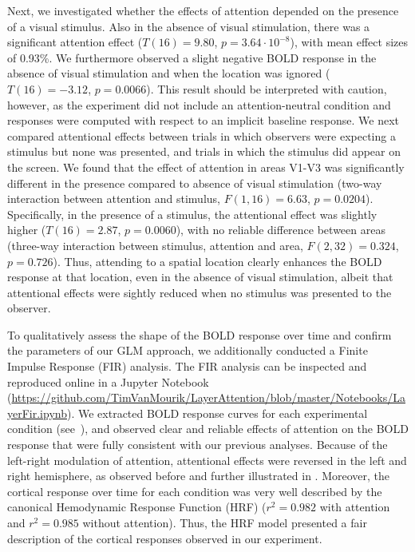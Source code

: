 \documentclass[9pt,lineno]{aperture}
\begin{document}
Next, we investigated whether the effects of attention depended on the presence of a visual stimulus. Also in the absence of visual stimulation, there was a significant attention effect ($T(16)=9.80$, $p=3.64 \cdot 10^{-8}$), with mean effect sizes of 0.93\%. We furthermore observed a slight negative BOLD response in the absence of visual stimulation and when the location was ignored ($T(16)=-3.12$, $p=0.0066$). This result should be interpreted with caution, however, as the experiment did not include an attention-neutral condition and responses were computed with respect to an implicit baseline response. We next compared attentional effects between trials in which observers were expecting a stimulus but none was presented, and trials in which the stimulus did appear on the screen. We found that the effect of attention in areas V1-V3 was significantly different in the presence compared to absence of visual stimulation (two-way interaction between attention and stimulus, $F(1,16)=6.63$, $p=0.0204$). Specifically, in the presence of a stimulus, the attentional effect was slightly higher ($T(16)=2.87$, $p=0.0060$), with no reliable difference between areas (three-way interaction between stimulus, attention and area, $F(2,32)=0.324$, $p=0.726$). Thus, attending to a spatial location clearly enhances the BOLD response at that location, even in the absence of visual stimulation, albeit that attentional effects were sightly reduced when no stimulus was presented to the observer. 

To  qualitatively assess the shape of the BOLD response over time and confirm the parameters of our GLM approach, we additionally conducted a Finite Impulse Response (FIR) analysis. The FIR analysis can be inspected and reproduced online in a Jupyter Notebook (\url{https://github.com/TimVanMourik/LayerAttention/blob/master/Notebooks/LayerFir.ipynb}). We extracted BOLD response curves for each experimental condition (see~), and observed clear and reliable effects of attention on the BOLD response that were fully consistent with our previous analyses. Because of the left-right modulation of attention, attentional effects were reversed in the left and right hemisphere, as observed before and further illustrated in . Moreover, the cortical response over time for each condition was very well described by the canonical Hemodynamic Response Function (HRF) ($r^2=0.982$ with attention and $r^2=0.985$ without attention). Thus, the HRF model presented a fair description of the cortical responses observed in our experiment. 
\end{document}
